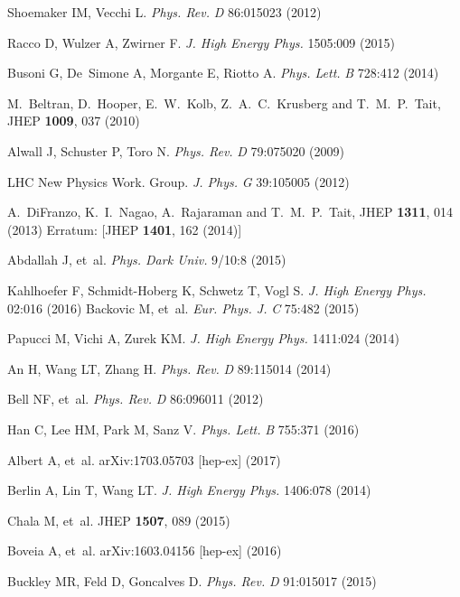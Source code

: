 \documentclass{ar-1col}
\begin{document}
\begin{thebibliography}{175}
Shoemaker IM, Vecchi L. \textit{Phys. Rev.} \textit{D} 86:015023 (2012)

Racco D, Wulzer A, Zwirner F. \textit{J. High Energy Phys.} 1505:009 (2015)

Busoni G, De~Simone A, Morgante E, Riotto A. \textit{Phys. Lett.}
\textit{B} 728:412 (2014)

  M.~Beltran, D.~Hooper, E.~W.~Kolb, Z.~A.~C.~Krusberg and T.~M.~P.~Tait,
  JHEP {\bf 1009}, 037 (2010)

Alwall J, Schuster P, Toro N. \textit{Phys. Rev.} \textit{D} 79:075020
(2009)

{LHC New Physics Work. Group}. \textit{J. Phys.} \textit{G} 39:105005
(2012)

  A.~DiFranzo, K.~I.~Nagao, A.~Rajaraman and T.~M.~P.~Tait,
  JHEP {\bf 1311}, 014 (2013)
  Erratum: [JHEP {\bf 1401}, 162 (2014)]

Abdallah J, et~al. \textit{Phys. Dark Univ.} 9/10:8 (2015)

Kahlhoefer F, Schmidt-Hoberg K, Schwetz T, Vogl S. \textit{J. High Energy Phys.}
02:016 (2016)
Backovic M, et~al. \textit{Eur. Phys. J.} \textit{C} 75:482 (2015)

Papucci M, Vichi A, Zurek KM. \textit{J. High Energy Phys.} 1411:024 (2014)

An H, Wang LT, Zhang H. \textit{Phys. Rev.} \textit{D} 89:115014 (2014)

Bell NF, et~al. \textit{Phys. Rev.} \textit{D} 86:096011 (2012)

Han C, Lee HM, Park M, Sanz V. \textit{Phys. Lett.} \textit{B} 755:371
(2016)

Albert A, et~al. arXiv:1703.05703 [hep-ex] (2017)

Berlin A, Lin T, Wang LT. \textit{J. High Energy Phys.} 1406:078 (2014)

Chala M, et~al. JHEP {\bf 1507}, 089 (2015)

Boveia A, et~al. arXiv:1603.04156 [hep-ex] (2016)

Buckley MR, Feld D, Goncalves D. \textit{Phys. Rev.} \textit{D} 91:015017
(2015)


\end{thebibliography}
\end{document}
